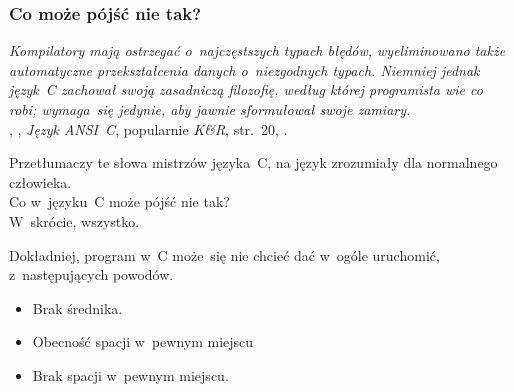 \documentclass[10pt,t]{beamer}
\begin{document}
\begin{frame}
  \frametitle{Co może pójść nie tak?}


  \textit{Kompilatory mają ostrzegać o~najczęstszych typach błędów,
    wyeliminowano także automatyczne przekształcenia danych o~niezgodnych
    typach. Niemniej jednak język~C zachował swoją zasadniczą filozofię,
    według której programista wie co robi; wymaga~się jedynie, aby jawnie
    sformułował swoje zamiary.} \\
  ,
  , \textit{Język ANSI~C}, popularnie
  \textit{K\&R}, str.~20,
  \parencite{Kernighan-Ritchie-Jezyk-ANSI-C-Pub-2004}.

  Przetłumaczy te słowa mistrzów języka~C, na język zrozumiały dla
  normalnego człowieka. \\
  Co w~języku~C może pójść nie tak? \\
  W~skrócie, wszystko.

  Dokładniej, program w~C może~się nie chcieć dać w~ogóle uruchomić,
  z~następujących powodów.

  \vspace{-0.5em}



  \begin{itemize}

  \item Brak średnika.

  \item Obecność spacji w~pewnym miejscu

  \item Brak spacji w~pewnym miejscu.

  \end{itemize}

\end{frame}
\end{document}

